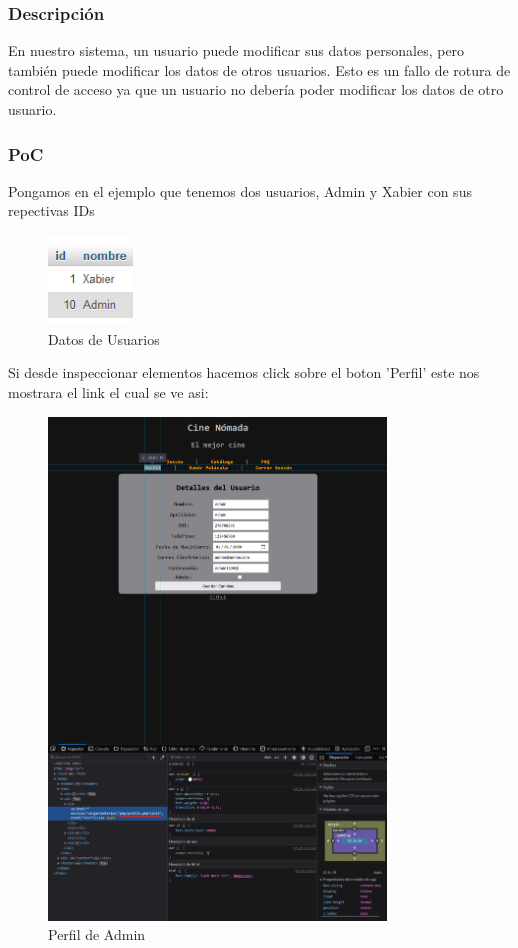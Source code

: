 \documentclass{report}
\begin{document}
                \subsubsection{Descripción}
                    En nuestro sistema, un usuario puede modificar sus datos personales, pero también puede modificar los datos de otros usuarios. 
                    Esto es un fallo de rotura de control de acceso ya que un usuario no debería poder modificar los datos de otro usuario.
                \subsubsection{PoC}
                    Pongamos en el ejemplo que tenemos dos usuarios, Admin y Xabier con sus repectivas IDs
                    \begin{figure}[H]
                        \centering
                        \includegraphics[width=0.2\textwidth]{./img/vulnerabilidades/3.1/1.1.png}
                        \caption{Datos de Usuarios}
                    \end{figure}
                    Si desde inspeccionar elementos hacemos click sobre el boton 'Perfil' este nos mostrara el link el cual se ve asi:
                    \begin{figure}[H]
                        \centering
                        \includegraphics[width=0.8\textwidth]{./img/vulnerabilidades/3.1/1.2.png}
                        \caption{Perfil de Admin}
                    \end{figure}
\end{document}

